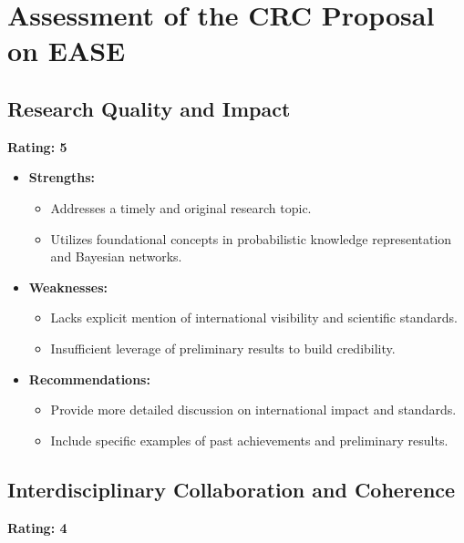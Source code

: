 \documentclass{article}
\begin{document}
\section{Assessment of the CRC Proposal on EASE}

\subsection{Research Quality and Impact}
\textbf{Rating: 5}

\begin{itemize}
    \item \textbf{Strengths:} 
    \begin{itemize}
        \item Addresses a timely and original research topic.
        \item Utilizes foundational concepts in probabilistic knowledge representation and Bayesian networks.
    \end{itemize}
    \item \textbf{Weaknesses:} 
    \begin{itemize}
        \item Lacks explicit mention of international visibility and scientific standards.
        \item Insufficient leverage of preliminary results to build credibility.
    \end{itemize}
    \item \textbf{Recommendations:}
    \begin{itemize}
        \item Provide more detailed discussion on international impact and standards.
        \item Include specific examples of past achievements and preliminary results.
    \end{itemize}
\end{itemize}

\subsection{Interdisciplinary Collaboration and Coherence}
\textbf{Rating: 4}
\end{document}
